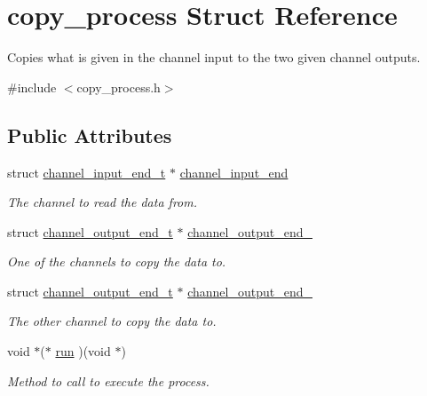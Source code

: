 \hypertarget{structcopy__process}{\section{copy\-\_\-process Struct Reference}
\label{structcopy__process}
}


Copies what is given in the channel input to the two given channel outputs.  




{\ttfamily \#include $<$copy\-\_\-process.\-h$>$}

\subsection*{Public Attributes}
\begin{DoxyCompactItemize}
\item 
\hypertarget{structcopy__process_ab2acb8c5b1038b57c7e18f979433a0ca}{struct \hyperlink{structchannel__input__end__t}{channel\-\_\-input\-\_\-end\-\_\-t} $\ast$ \hyperlink{structcopy__process_ab2acb8c5b1038b57c7e18f979433a0ca}{channel\-\_\-input\-\_\-end}}\label{structcopy__process_ab2acb8c5b1038b57c7e18f979433a0ca}

\begin{DoxyCompactList}\small\item\em The channel to read the data from. \end{DoxyCompactList}\item 
\hypertarget{structcopy__process_a67b6ca0d2b183efaa8cb516637aacdec}{struct \hyperlink{structchannel__output__end__t}{channel\-\_\-output\-\_\-end\-\_\-t} $\ast$ \hyperlink{structcopy__process_a67b6ca0d2b183efaa8cb516637aacdec}{channel\-\_\-output\-\_\-end\-\_}}\label{structcopy__process_a67b6ca0d2b183efaa8cb516637aacdec}

\begin{DoxyCompactList}\small\item\em One of the channels to copy the data to. \end{DoxyCompactList}\item 
\hypertarget{structcopy__process_a60a2af05b62c6c23b4be7257ca29fa46}{struct \hyperlink{structchannel__output__end__t}{channel\-\_\-output\-\_\-end\-\_\-t} $\ast$ \hyperlink{structcopy__process_a60a2af05b62c6c23b4be7257ca29fa46}{channel\-\_\-output\-\_\-end\-\_}}\label{structcopy__process_a60a2af05b62c6c23b4be7257ca29fa46}

\begin{DoxyCompactList}\small\item\em The other channel to copy the data to. \end{DoxyCompactList}\item 
\hypertarget{structcopy__process_a440d03f690cce41f8857fe5f147deff5}{void $\ast$($\ast$ \hyperlink{structcopy__process_a440d03f690cce41f8857fe5f147deff5}{run} )(void $\ast$)}\label{structcopy__process_a440d03f690cce41f8857fe5f147deff5}

\begin{DoxyCompactList}\small\item\em Method to call to execute the process. \end{DoxyCompactList}\end{DoxyCompactItemize}


